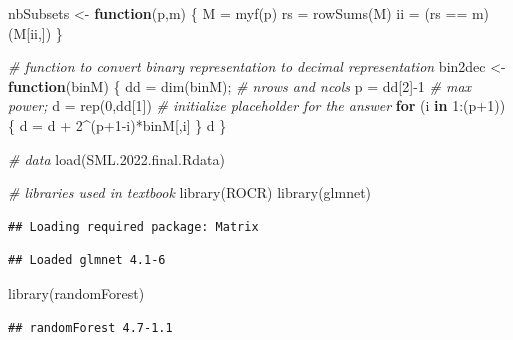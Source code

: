 \documentclass[
  11pt,
]{article}
\newenvironment{Shaded}{\begin{snugshade}}{\end{snugshade}}
\newcommand{\CommentTok}[1]{\textcolor[rgb]{0.56,0.35,0.01}{\textit{#1}}}
\newcommand{\ControlFlowTok}[1]{\textcolor[rgb]{0.13,0.29,0.53}{\textbf{#1}}}
\newcommand{\DecValTok}[1]{\textcolor[rgb]{0.00,0.00,0.81}{#1}}
\newcommand{\FunctionTok}[1]{\textcolor[rgb]{0.00,0.00,0.00}{#1}}
\newcommand{\NormalTok}[1]{#1}
\newcommand{\OtherTok}[1]{\textcolor[rgb]{0.56,0.35,0.01}{#1}}
\newcommand{\SpecialCharTok}[1]{\textcolor[rgb]{0.00,0.00,0.00}{#1}}
\newcommand{\StringTok}[1]{\textcolor[rgb]{0.31,0.60,0.02}{#1}}
\begin{document}
\begin{Shaded}
\begin{Highlighting}[]
\NormalTok{nbSubsets }\OtherTok{\textless{}{-}} \ControlFlowTok{function}\NormalTok{(p,m) \{}
\NormalTok{  M  }\OtherTok{=} \FunctionTok{myf}\NormalTok{(p)}
\NormalTok{  rs }\OtherTok{=} \FunctionTok{rowSums}\NormalTok{(M)}
\NormalTok{  ii }\OtherTok{=}\NormalTok{ (rs }\SpecialCharTok{==}\NormalTok{ m)}
\NormalTok{  (M[ii,])}
\NormalTok{\}}

\CommentTok{\# function to convert binary representation to decimal representation }
\NormalTok{bin2dec }\OtherTok{\textless{}{-}} \ControlFlowTok{function}\NormalTok{(binM) \{}
\NormalTok{  dd }\OtherTok{=} \FunctionTok{dim}\NormalTok{(binM);  }\CommentTok{\# nrows and ncols}
\NormalTok{  p }\OtherTok{=}\NormalTok{ dd[}\DecValTok{2}\NormalTok{]}\SpecialCharTok{{-}}\DecValTok{1}      \CommentTok{\# max power; }
\NormalTok{  d }\OtherTok{=} \FunctionTok{rep}\NormalTok{(}\DecValTok{0}\NormalTok{,dd[}\DecValTok{1}\NormalTok{]) }\CommentTok{\# initialize placeholder for the answer}
  \ControlFlowTok{for}\NormalTok{ (i }\ControlFlowTok{in} \DecValTok{1}\SpecialCharTok{:}\NormalTok{(p}\SpecialCharTok{+}\DecValTok{1}\NormalTok{)) \{}
\NormalTok{    d }\OtherTok{=}\NormalTok{ d }\SpecialCharTok{+} \DecValTok{2}\SpecialCharTok{\^{}}\NormalTok{(p}\SpecialCharTok{+}\DecValTok{1}\SpecialCharTok{{-}}\NormalTok{i)}\SpecialCharTok{*}\NormalTok{binM[,i]}
\NormalTok{  \}}
\NormalTok{  d}
\NormalTok{\}}

\CommentTok{\# data}
\FunctionTok{load}\NormalTok{(}\StringTok{\textquotesingle{}SML.2022.final.Rdata\textquotesingle{}}\NormalTok{)}

\CommentTok{\# libraries used in textbook}
\FunctionTok{library}\NormalTok{(ROCR)}
\FunctionTok{library}\NormalTok{(glmnet)}
\end{Highlighting}
\end{Shaded}

\begin{verbatim}
## Loading required package: Matrix
\end{verbatim}

\begin{verbatim}
## Loaded glmnet 4.1-6
\end{verbatim}

\begin{Shaded}
\begin{Highlighting}[]
\FunctionTok{library}\NormalTok{(randomForest)}
\end{Highlighting}
\end{Shaded}

\begin{verbatim}
## randomForest 4.7-1.1
\end{verbatim}
\end{document}

